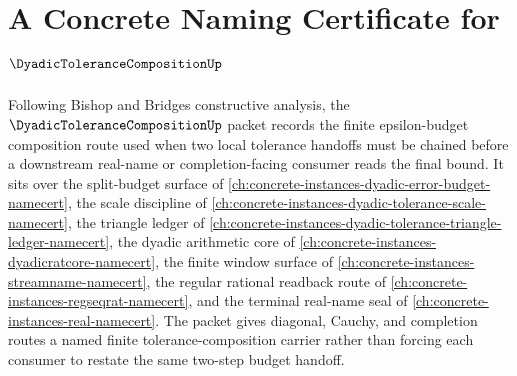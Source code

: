 \chapter{A Concrete Naming Certificate for $\DyadicToleranceCompositionUp$}
\label{ch:concrete-instances-dyadic-tolerance-composition-namecert}

Following Bishop and Bridges constructive analysis, the $\DyadicToleranceCompositionUp$ packet records the finite epsilon-budget composition route used when two local tolerance handoffs must be chained before a downstream real-name or completion-facing consumer reads the final bound. It sits over the split-budget surface of \autoref{ch:concrete-instances-dyadic-error-budget-namecert}, the scale discipline of \autoref{ch:concrete-instances-dyadic-tolerance-scale-namecert}, the triangle ledger of \autoref{ch:concrete-instances-dyadic-tolerance-triangle-ledger-namecert}, the dyadic arithmetic core of \autoref{ch:concrete-instances-dyadicratcore-namecert}, the finite window surface of \autoref{ch:concrete-instances-streamname-namecert}, the regular rational readback route of \autoref{ch:concrete-instances-regseqrat-namecert}, and the terminal real-name seal of \autoref{ch:concrete-instances-real-namecert}. The packet gives diagonal, Cauchy, and completion routes a named finite tolerance-composition carrier rather than forcing each consumer to restate the same two-step budget handoff.

